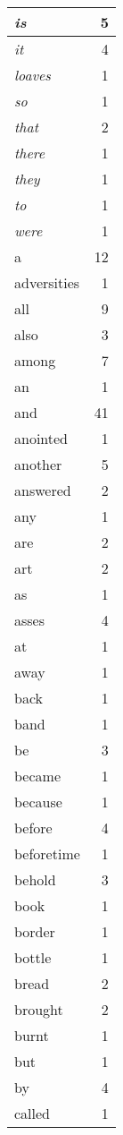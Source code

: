 \begin{center}
\begin{longtable}{l|r}
\emph{is} & 5 \\ \hline
\emph{it} & 4 \\ \hline
\emph{loaves} & 1 \\ \hline
\emph{so} & 1 \\ \hline
\emph{that} & 2 \\ \hline
\emph{there} & 1 \\ \hline
\emph{they} & 1 \\ \hline
\emph{to} & 1 \\ \hline
\emph{were} & 1 \\ \hline
a & 12 \\ \hline
adversities & 1 \\ \hline
all & 9 \\ \hline
also & 3 \\ \hline
among & 7 \\ \hline
an & 1 \\ \hline
and & 41 \\ \hline
anointed & 1 \\ \hline
another & 5 \\ \hline
answered & 2 \\ \hline
any & 1 \\ \hline
are & 2 \\ \hline
art & 2 \\ \hline
as & 1 \\ \hline
asses & 4 \\ \hline
at & 1 \\ \hline
away & 1 \\ \hline
back & 1 \\ \hline
band & 1 \\ \hline
be & 3 \\ \hline
became & 1 \\ \hline
because & 1 \\ \hline
before & 4 \\ \hline
beforetime & 1 \\ \hline
behold & 3 \\ \hline
book & 1 \\ \hline
border & 1 \\ \hline
bottle & 1 \\ \hline
bread & 2 \\ \hline
brought & 2 \\ \hline
burnt & 1 \\ \hline
but & 1 \\ \hline
by & 4 \\ \hline
called & 1 \\ \hline

\end{longtable}
\end{center}
